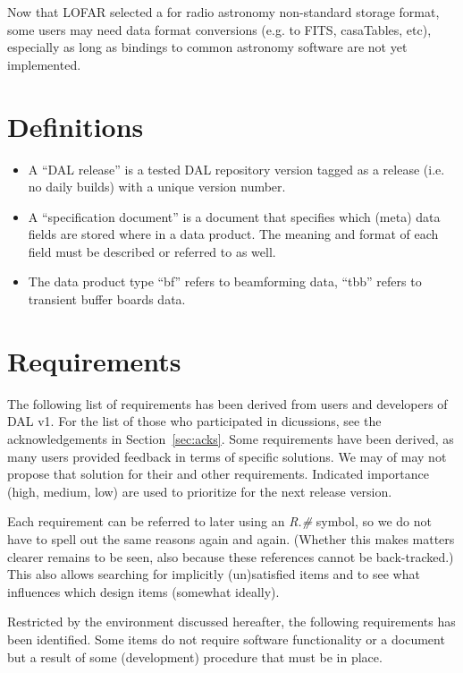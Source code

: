 \documentclass[a4paper,11pt]{article}
\begin{document}
Now that LOFAR selected a for radio astronomy non-standard storage format, some users may need data format conversions (e.g. to FITS, casaTables, etc), especially as long as bindings to common astronomy software are not yet implemented.


\section{Definitions} \label{sec:definitions}
\begin{itemize}
\itemsep0em
\item A ``DAL release'' is a tested DAL repository version tagged as a release (i.e. no daily builds) with a unique version number.
\item A ``specification document'' is a document that specifies which (meta) data fields are stored where in a data product.
The meaning and format of each field must be described or referred to as well.
\item The data product type ``bf'' refers to beamforming data, ``tbb'' refers to transient buffer boards data.
\end{itemize}


\section{Requirements} \label{sec:reqs}
The following list of requirements has been derived from users and developers of DAL v1.
For the list of those who participated in dicussions, see the acknowledgements in Section~\ref{sec:acks}.
Some requirements have been derived, as many users provided feedback in terms of specific solutions.
We may of may not propose that solution for their and other requirements.
Indicated importance (high, medium, low) are used to prioritize for the next release version.

Each requirement can be referred to later using an \textit{R.\#} symbol, so we do not have to spell out the same reasons again and again. %
(Whether this makes matters clearer remains to be seen, also because these references cannot be back-tracked.)
This also allows searching for implicitly (un)satisfied items and to see what influences which design items (somewhat ideally).

Restricted by the environment discussed hereafter, the following requirements has been identified.
Some items do not require software functionality or a document but a result of some (development) procedure that must be in place.
\end{document}

